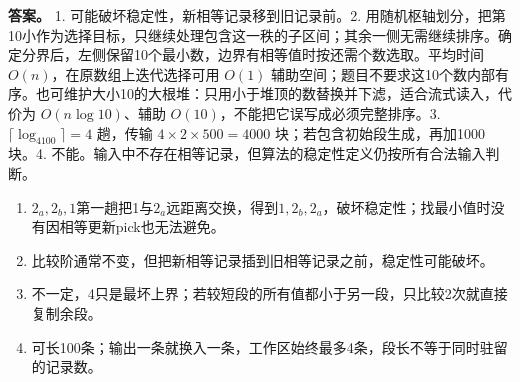 \textbf{答案。} 1. 可能破坏稳定性，新相等记录移到旧记录前。2. 用随机枢轴划分，把第10小作为选择目标，只继续处理包含这一秩的子区间；其余一侧无需继续排序。确定分界后，左侧保留10个最小数，边界有相等值时按还需个数选取。平均时间 \(O(n)\)，在原数组上迭代选择可用 \(O(1)\) 辅助空间；题目不要求这10个数内部有序。也可维护大小10的大根堆：只用小于堆顶的数替换并下滤，适合流式读入，代价为 \(O(n\log10)\)、辅助 \(O(10)\)，不能把它误写成必须完整排序。3. \(\lceil\log_4100\rceil=4\) 趟，传输 \(4\times2\times500=4000\) 块；若包含初始段生成，再加1000块。4. 不能。输入中不存在相等记录，但算法的稳定性定义仍按所有合法输入判断。

\begin{enumerate}
\def\labelenumi{\arabic{enumi}.}
\setcounter{enumi}{4}
\tightlist
\item
  \(2_a,2_b,1\)第一趟把1与\(2_a\)远距离交换，得到\(1,2_b,2_a\)，破坏稳定性；找最小值时没有因相等更新pick也无法避免。
\item
  比较阶通常不变，但把新相等记录插到旧相等记录之前，稳定性可能破坏。
\item
  不一定，4只是最坏上界；若较短段的所有值都小于另一段，只比较2次就直接复制余段。
\item
  可长100条；输出一条就换入一条，工作区始终最多4条，段长不等于同时驻留的记录数。
\end{enumerate}
